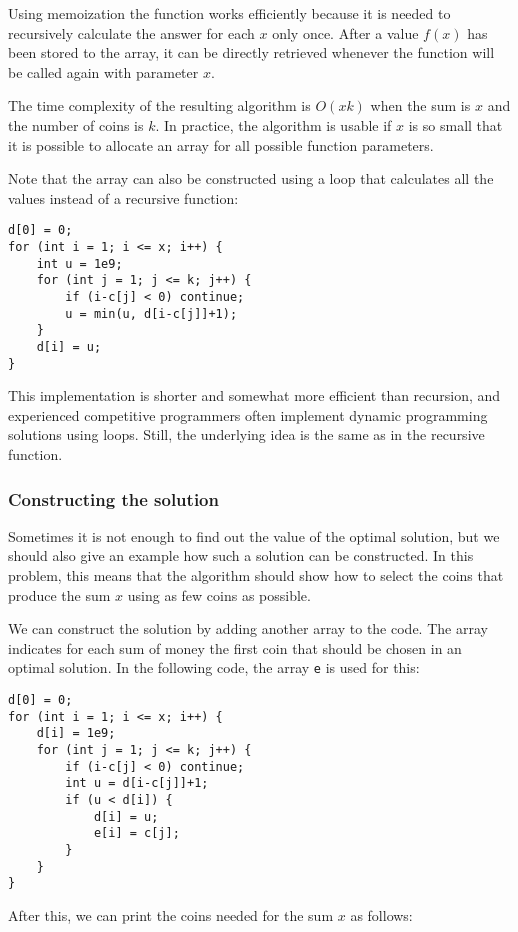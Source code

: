 Using memoization the function works
efficiently because it is needed to
recursively calculate
the answer for each $x$ only once.
After a value $f(x)$ has been stored to the array,
it can be directly retrieved whenever the
function will be called again with parameter $x$.

The time complexity of the resulting algorithm
is $O(xk)$ when the sum is $x$ and the number of
coins is $k$.
In practice, the algorithm is usable if
$x$ is so small that it is possible to allocate
an array for all possible function parameters.

Note that the array can also be constructed using
a loop that calculates all the values
instead of a recursive function:
\begin{lstlisting}
d[0] = 0;
for (int i = 1; i <= x; i++) {
    int u = 1e9;
    for (int j = 1; j <= k; j++) {
        if (i-c[j] < 0) continue;
        u = min(u, d[i-c[j]]+1);
    }
    d[i] = u;
}
\end{lstlisting}

This implementation is shorter and somewhat
more efficient than recursion,
and experienced competitive programmers
often implement dynamic programming solutions
using loops.
Still, the underlying idea is the same as
in the recursive function.

\subsubsection{Constructing the solution}

Sometimes it is not enough to find out the value
of the optimal solution, but we should also give
an example how such a solution can be constructed.
In this problem, this means that the algorithm
should show how to select the coins that produce
the sum $x$ using as few coins as possible.

We can construct the solution by adding another
array to the code. The array indicates for
each sum of money the first coin that should be
chosen in an optimal solution.
In the following code, the array \texttt{e}
is used for this:

\begin{lstlisting}
d[0] = 0;
for (int i = 1; i <= x; i++) {
    d[i] = 1e9;
    for (int j = 1; j <= k; j++) {
        if (i-c[j] < 0) continue;
        int u = d[i-c[j]]+1;
        if (u < d[i]) {
            d[i] = u;
            e[i] = c[j];
        }
    }
}
\end{lstlisting}

After this, we can print the coins needed
for the sum $x$ as follows:

